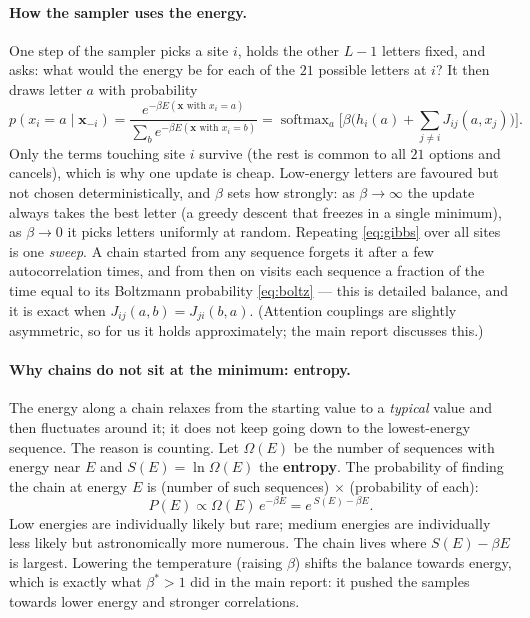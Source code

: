 \documentclass[10pt,a4paper]{article}
\begin{document}
\paragraph{How the sampler uses the energy.} One step of the sampler picks a site $i$, holds the
other $L-1$ letters fixed, and asks: what would the energy be for each of the $21$ possible letters
at $i$? It then draws letter $a$ with probability
\begin{equation}
p(x_i=a\mid\bm x_{-i})=\frac{e^{-\beta E(\bm x\text{ with }x_i=a)}}{\sum_b e^{-\beta E(\bm x\text{ with }x_i=b)}}
=\operatorname{softmax}_a\Big[\beta\Big(h_i(a)+\sum_{j\neq i}J_{ij}(a,x_j)\Big)\Big] .
\label{eq:gibbs}
\end{equation}
Only the terms touching site $i$ survive (the rest is common to all $21$ options and cancels), which
is why one update is cheap. Low-energy letters are favoured but not chosen deterministically, and
$\beta$ sets how strongly: as $\beta\to\infty$ the update always takes the best letter (a greedy
descent that freezes in a single minimum), as $\beta\to0$ it picks letters uniformly at random.
Repeating \eqref{eq:gibbs} over all sites is one \emph{sweep}. A chain started from any sequence
forgets it after a few autocorrelation times, and from then on visits each sequence a fraction of
the time equal to its Boltzmann probability \eqref{eq:boltz} --- this is detailed balance, and it is
exact when $J_{ij}(a,b)=J_{ji}(b,a)$. (Attention couplings are slightly asymmetric, so for us it holds
approximately; the main report discusses this.)

\paragraph{Why chains do not sit at the minimum: entropy.} The energy along a chain relaxes from the
starting value to a \emph{typical} value and then fluctuates around it; it does not keep going down
to the lowest-energy sequence. The reason is counting. Let $\Omega(E)$ be the number of sequences
with energy near $E$ and $S(E)=\ln\Omega(E)$ the \textbf{entropy}. The probability of finding the
chain at energy $E$ is (number of such sequences) $\times$ (probability of each):
\begin{equation}
P(E)\propto\Omega(E)\,e^{-\beta E}=e^{\,S(E)-\beta E} .
\end{equation}
Low energies are individually likely but rare; medium energies are individually less likely but
astronomically more numerous. The chain lives where $S(E)-\beta E$ is largest. Lowering the temperature
(raising $\beta$) shifts the balance towards energy, which is exactly what $\beta^*>1$ did in the main
report: it pushed the samples towards lower energy and stronger correlations.
\end{document}
